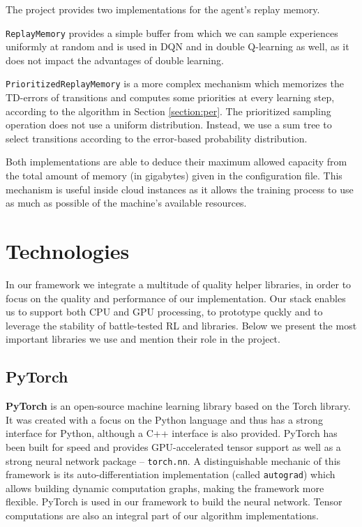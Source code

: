 The project provides two implementations for the agent’s replay memory.

\texttt{ReplayMemory} provides a simple buffer from which we can sample experiences uniformly at random and is used in DQN and in double Q-learning as well, as it does not impact the advantages of double learning.

\texttt{PrioritizedReplayMemory} is a more complex mechanism which memorizes the TD-errors of transitions and computes some priorities at every learning step, according to the algorithm in Section \ref{section:per}.
The prioritized sampling operation does not use a uniform distribution.
Instead, we use a sum tree to select transitions according to the error-based probability distribution.

Both implementations are able to deduce their maximum allowed capacity from the total amount of memory (in gigabytes) given in the configuration file.
This mechanism is useful inside cloud instances as it allows the training process to use as much as possible of the machine's available resources.

\section{Technologies} \label{section:technologies}
In our framework we integrate a multitude of quality helper libraries, in order to focus on the quality and performance of our implementation.
Our stack enables us to support both CPU and GPU processing, to prototype quckly and to leverage the stability of battle-tested RL and libraries.
Below we present the most important libraries we use and mention their role in the project.

\subsection{PyTorch}
\textbf{PyTorch} is an open-source machine learning library based on the Torch library.
It was created with a focus on the Python language \cite{pytorch-book} and thus has a strong interface for Python, although a C++ interface is also provided.
PyTorch has been built for speed and provides GPU-accelerated tensor support as well as a strong neural network package -- \verb|torch.nn|.
A distinguishable mechanic of this framework is its auto-differentiation implementation (called \texttt{autograd}) which allows building dynamic computation graphs, making the framework more flexible.
PyTorch is used in our framework to build the neural network.
Tensor computations are also an integral part of our algorithm implementations.

